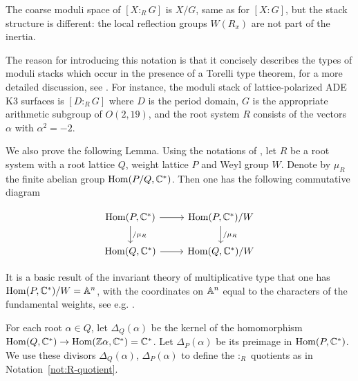 \documentclass[table,x11names]{amsart}
\begin{document}
\begin{notation}
 The coarse moduli space of $[X:_R G]$ is $X/G$, same as for $[X:G]$, but the stack
 structure is different: the local reflection groups $W(R_x)$ are not
 part of the inertia.
 
 The reason for introducing this notation is that it concisely describes the types of moduli stacks
 which occur in the presence of a Torelli type theorem, for a more detailed discussion, see
 \cite[Rem.~2.36, Thm.~8.12]{alexeev2021compact}. For instance, the moduli stack of lattice-polarized ADE
 K3 surfaces is $[{D}:_RG]$ where ${D}$ is the period domain, $G$ is the appropriate
 arithmetic subgroup of $O(2,19)$, and the root system $R$ consists 
 of the vectors $\alpha$ with $\alpha^2=-2$.
 \end{notation}

 We also prove the following Lemma.  Using the notations of
 \cite{bourbaki2002lie-groups}, let $R$ be a root system with a root
 lattice $Q$, weight lattice $P$ and Weyl group $W$.
 Denote by $\mu_R$
 the finite abelian group $\operatorname{Hom}(P/Q, {\mathbb C}^*)$. Then one has the
 following commutative diagram

 \begin{equation}
   \label{eq:PQ}
 \begin{tikzcd}
   \Hom(P,\bC^*) \ar[r] \ar[d, "/\mu_R"] & 
   \Hom(P,\bC^*)/W \ar[d, "/\mu_R"] \\
   \Hom(Q,\bC^*) \ar[r] &
   \Hom(Q,\bC^*)/W 
 \end{tikzcd}
 \end{equation}

 It is a basic result of the invariant theory of multiplicative type that
 one has $\operatorname{Hom}(P,{\mathbb C}^*)/W = {\mathbb A}^n$, with the coordinates on ${\mathbb A}^n$ equal to
 the characters of the fundamental weights, see e.g. \cite[Ch.8, \S7,
 Thm.2]{bourbaki2005lie-groups}.
 
 For each root $\alpha\in Q$, let $\Delta_Q(\alpha)$ be the kernel of
 the homomorphism $\operatorname{Hom}(Q,{\mathbb C}^*)\to\operatorname{Hom}({\mathbb Z}\alpha,{\mathbb C}^*)={\mathbb C}^*$. Let
 $\Delta_P(\alpha)$ be its preimage in $\operatorname{Hom}(P,{\mathbb C}^*)$. We use these
 divisors $\Delta_Q(\alpha)$, $\Delta_P(\alpha)$ to define the
 $:_R$ quotients as in Notation~\ref{not:R-quotient}. 
 
\end{document}
